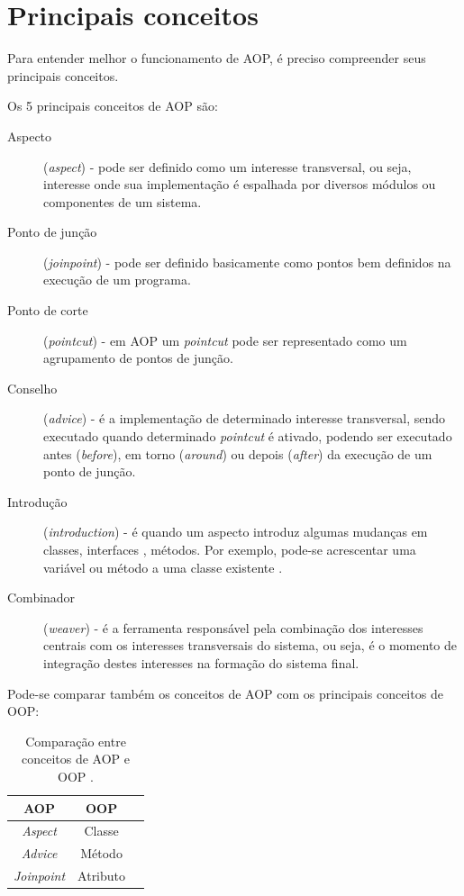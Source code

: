 \documentclass[tc,openright]{iiufrgs}
\begin{document}
\section{Principais conceitos}

Para entender melhor o funcionamento de AOP, é preciso compreender seus principais conceitos. 

Os 5 principais conceitos de AOP são:

\begin{description}
\item [Aspecto] (\textit{aspect}) - pode ser definido como um interesse transversal, ou seja, interesse onde sua implementação é espalhada por diversos módulos ou componentes de um sistema.
\item [Ponto de junção] (\textit{joinpoint}) - pode ser definido basicamente como pontos bem definidos na execução de um programa.
\item [Ponto de corte] (\textit{pointcut}) - em AOP um \textit{pointcut} pode ser representado como um agrupamento de pontos de junção.
\item [Conselho] (\textit{advice}) - é a implementação de determinado interesse transversal, sendo executado quando determinado \textit{pointcut} é ativado, podendo ser executado antes (\textit{before}), em torno (\textit{around}) ou depois (\textit{after}) da execução de um ponto de junção.
\item [Introdução] (\textit{introduction}) - é quando um aspecto introduz algumas mudanças em classes, interfaces , métodos. Por exemplo, pode-se acrescentar uma variável ou método a uma classe existente  \cite{laddad2003aspectj}.
\item [Combinador] (\textit{weaver}) - é a ferramenta responsável pela combinação dos interesses centrais com os interesses transversais do sistema, ou seja,  é o momento de integração destes interesses na formação do sistema final.

\end{description}


Pode-se comparar também os conceitos de AOP com os principais conceitos de OOP:

\begin{table}[ht]
	\centering
	\caption{Comparação entre conceitos de AOP e OOP \cite{jacobson2004aspect}.}
	
	\begin{tabular}[h]{c c l}
		\hline 
		\textbf{AOP} & \textbf{OOP} \\
		\hline
		\textit{Aspect}&Classe \\
		\textit{Advice}&Método \\
		\textit{Joinpoint}&Atributo \\
		\hline
	\end{tabular}
	\label{tab:comparacaoAOPOOP}
\end{table}
\end{document}
